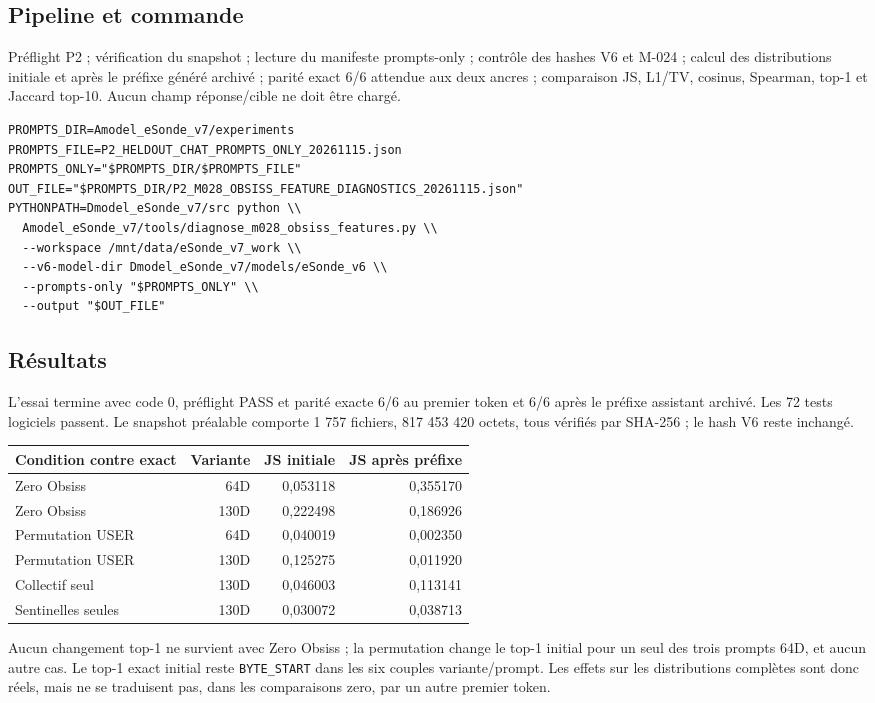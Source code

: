 \documentclass[11pt,a4paper]{report}
\begin{document}
\subsection{Pipeline et commande}
Préflight P2 ; vérification du snapshot ; lecture du manifeste prompts-only ; contrôle des hashes V6 et M-024 ; calcul des distributions initiale et après le préfixe généré archivé ; parité exact 6/6 attendue aux deux ancres ; comparaison JS, L1/TV, cosinus, Spearman, top-1 et Jaccard top-10. Aucun champ réponse/cible ne doit être chargé.
\begin{verbatim}
PROMPTS_DIR=Amodel_eSonde_v7/experiments
PROMPTS_FILE=P2_HELDOUT_CHAT_PROMPTS_ONLY_20261115.json
PROMPTS_ONLY="$PROMPTS_DIR/$PROMPTS_FILE"
OUT_FILE="$PROMPTS_DIR/P2_M028_OBSISS_FEATURE_DIAGNOSTICS_20261115.json"
PYTHONPATH=Dmodel_eSonde_v7/src python \\
  Amodel_eSonde_v7/tools/diagnose_m028_obsiss_features.py \\
  --workspace /mnt/data/eSonde_v7_work \\
  --v6-model-dir Dmodel_eSonde_v7/models/eSonde_v6 \\
  --prompts-only "$PROMPTS_ONLY" \\
  --output "$OUT_FILE"
\end{verbatim}
\subsection{Résultats}
L'essai termine avec code 0, préflight PASS et parité exacte 6/6 au premier token et 6/6 après le préfixe assistant archivé. Les 72 tests logiciels passent. Le snapshot préalable comporte 1 757 fichiers, 817 453 420 octets, tous vérifiés par SHA-256 ; le hash V6 reste inchangé.
\begin{center}
\begin{tabular}{lrrr}
\toprule
Condition contre exact & Variante & JS initiale & JS après préfixe \\
\midrule
Zero Obsiss & 64D & 0,053118 & 0,355170 \\
Zero Obsiss & 130D & 0,222498 & 0,186926 \\
Permutation USER & 64D & 0,040019 & 0,002350 \\
Permutation USER & 130D & 0,125275 & 0,011920 \\
Collectif seul & 130D & 0,046003 & 0,113141 \\
Sentinelles seules & 130D & 0,030072 & 0,038713 \\
\bottomrule
\end{tabular}
\end{center}
Aucun changement top-1 ne survient avec Zero Obsiss ; la permutation change le top-1 initial pour un seul des trois prompts 64D, et aucun autre cas. Le top-1 exact initial reste \texttt{BYTE\_START} dans les six couples variante/prompt. Les effets sur les distributions complètes sont donc réels, mais ne se traduisent pas, dans les comparaisons zero, par un autre premier token.
\end{document}
